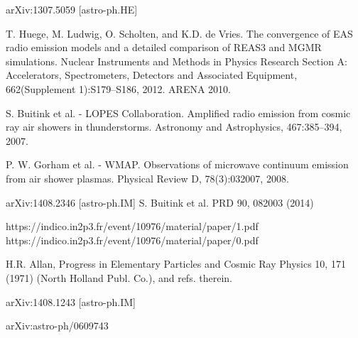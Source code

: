 \begin{thebibliography}{1}
 arXiv:1307.5059 [astro-ph.HE]

 T. Huege, M. Ludwig, O. Scholten, and K.D. de Vries. The convergence of EAS radio emission models and a detailed comparison of REAS3 and MGMR simulations. Nuclear Instruments and Methods in Physics Research Section A: Accelerators, Spectrometers, Detectors and Associated Equipment, 662(Supplement 1):S179–S186, 2012. ARENA 2010.

 S. Buitink et al. - LOPES Collaboration. Amplified radio emission from cosmic ray air showers in thunderstorms. Astronomy and Astrophysics, 467:385–394, 2007.
 

 P. W. Gorham et al. - WMAP. Observations of microwave continuum emission from air shower plasmas. Physical Review D, 78(3):032007, 2008.

 
 arXiv:1408.2346 [astro-ph.IM]
 S. Buitink et al. PRD 90, 082003 (2014)

 https://indico.in2p3.fr/event/10976/material/paper/1.pdf
 https://indico.in2p3.fr/event/10976/material/paper/0.pdf

 H.R. Allan, Progress in Elementary Particles and Cosmic Ray Physics 10, 171 (1971) (North Holland Publ. Co.), and refs. therein.

 arXiv:1408.1243 [astro-ph.IM]

 arXiv:astro-ph/0609743


\end{thebibliography}
